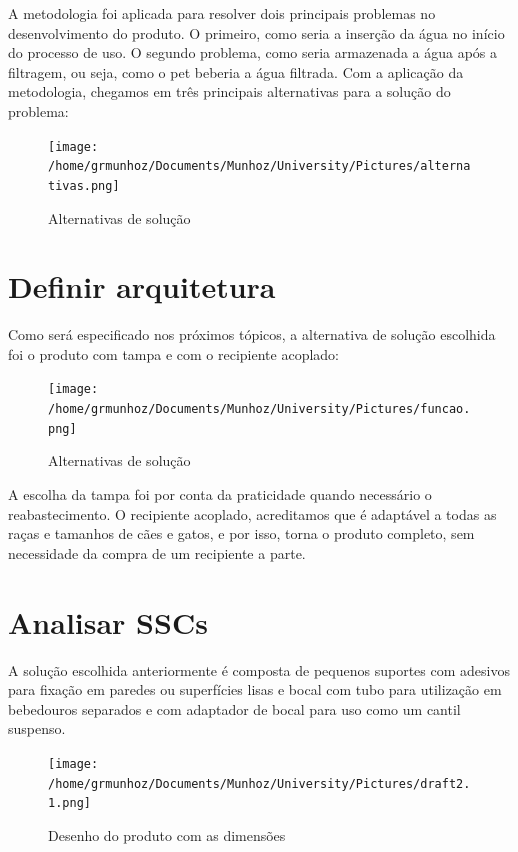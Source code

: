 \documentclass[
	12pt,				%
	openright,			%
	oneside,			%
	a4paper,			%
	english,			%
	french,				%
	spanish,			%
	brazil				%
	]{abntex2}
\begin{document}
A metodologia foi aplicada para resolver dois principais problemas no desenvolvimento do produto. O primeiro, como seria a inserção da água no início do processo de uso. O segundo problema, como seria armazenada a água após a filtragem, ou seja, como o pet beberia a água filtrada. Com a aplicação da metodologia, chegamos em três principais alternativas para a solução do problema:

\begin{figure}[H]
\begin{center}
\caption{Alternativas de solução}
\texttt{[image: /home/grmunhoz/Documents/Munhoz/University/Pictures/alternativas.png]} 
\label{figetapas}
\end{center}
\end{figure}

\section{Definir arquitetura}

Como será especificado nos próximos tópicos, a alternativa de solução escolhida foi o produto com tampa e com o recipiente acoplado:

\begin{figure}[H]
\begin{center}
\caption{Alternativas de solução}
\texttt{[image: /home/grmunhoz/Documents/Munhoz/University/Pictures/funcao.png]} 
\label{figetapas}
\end{center}
\end{figure}


A escolha da tampa foi por conta da praticidade quando necessário o reabastecimento. O recipiente acoplado, acreditamos que é adaptável a todas as raças e tamanhos de cães e gatos, e por isso, torna o produto completo, sem necessidade da compra de um recipiente a parte.

\section{Analisar SSCs}

A solução escolhida anteriormente é composta de pequenos suportes com adesivos para fixação em paredes ou superfícies lisas e bocal com tubo para utilização em bebedouros separados e com adaptador de bocal para uso como um cantil suspenso.

\begin{figure}[H]
\begin{center}
\caption{Desenho do produto com as dimensões}
\texttt{[image: /home/grmunhoz/Documents/Munhoz/University/Pictures/draft2.1.png]} 
\label{figetapas}
\end{center}
\end{figure}
\end{document}
